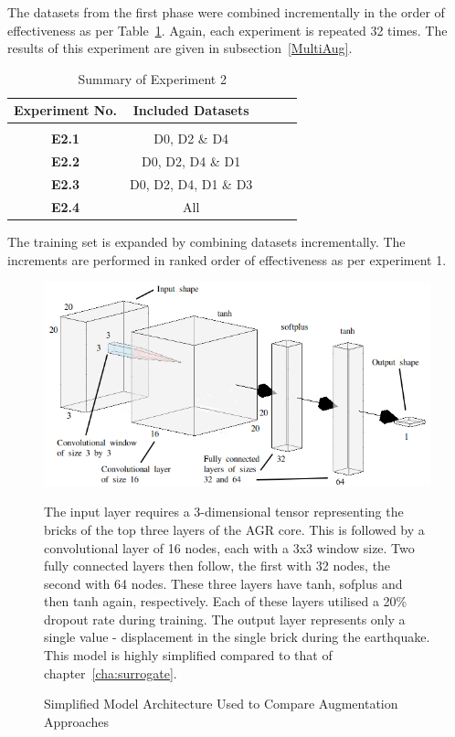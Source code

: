 \noindent
The datasets from the first phase were combined incrementally in the order of effectiveness as per Table~\ref{tab:Experiment2}. Again, each experiment is repeated 32 times. The results of this experiment are given in subsection~\ref{MultiAug}. 

\begin{table}[h!]
	 \begin{center}
		
		\begin{tabular}{c|c|c|r|c} %
			\textbf{Experiment No.} & \textbf{Included Datasets}  \\
			
			\hline
			& \\
			
			\textbf{E2.1} & D0, D2 \& D4 \\     %
			\textbf{E2.2} & D0, D2, D4  \& D1 \\  %
			\textbf{E2.3} & D0, D2, D4, D1 \& D3  \\  %
			\textbf{E2.4} & All \\
			
		\end{tabular}
		\caption{Summary of Experiment 2} {The training set is expanded by combining datasets incrementally. The increments are performed in ranked order of effectiveness as per experiment 1.}
		\label{tab:Experiment2}
		 \end{center}
\end{table}

\begin{figure}[h]
	\centering
	\includegraphics[scale=0.35]{Figures/SimpleModelImproved2.png}
	\caption{ Simplified Model Architecture Used to Compare Augmentation Approaches} {The input layer requires a 3-dimensional tensor representing the bricks of the top three layers of the AGR core. This is followed by a convolutional layer of 16 nodes, each with a 3x3 window size. Two fully connected layers then follow, the first with 32 nodes, the second with 64 nodes. These three layers have tanh, sofplus \cite{zheng2015improving} and then tanh again, respectively. Each of these layers utilised a 20\% dropout rate \cite{srivastava2014dropout} during training. The output layer represents only a single value - displacement in the single brick during the earthquake. This model is highly simplified compared to that of chapter~\ref{cha:surrogate}. }
	\label{fig:SimpleModel}
\end{figure}

